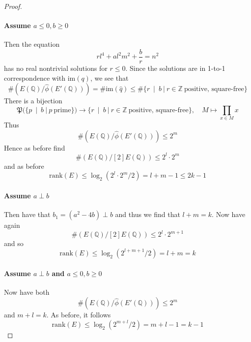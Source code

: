 \documentclass{scrartcl}
\newcommand{\Z}{\mathbb{Z}}
\newcommand{\Q}{\mathbb{Q}}
\newcommand{\im}{\mathrm{im}}
\newcommand{\divides}{\ \mid \ }
\theoremstyle{definition}
\begin{document}
\begin{proof}
    \paragraph{Assume $a \leq 0, b \geq 0$} Then the equation
    \begin{equation*}
        r l^4 + a l^2 m^2 + \frac b r = n^2
    \end{equation*}
    has no real nontrivial solutions for $r \leq 0$.
    Since the solutions are in 1-to-1 correspondence with $\im(q)$, we see that
    \begin{equation*}
        \#(E(\Q)/\hat{\phi}(E'(\Q))) = \#\im(\hat{q}) \leq \#\{ r \divides b \ | \ r \in \Z \ \text{positive, square-free} \}
    \end{equation*}
    There is a bijection
    \begin{equation*}
        \mathfrak{P}(\{ p \divides b \ | \ p \ \text{prime} \}) \to \{ r \divides b \ | \ r \in \Z \ \text{positive, square-free} \}, \quad M \mapsto \prod_{x \in M} x
    \end{equation*}
    Thus
    \begin{equation*}
        \#(E(\Q)/\hat{\phi}(E'(\Q))) \leq 2^m
    \end{equation*}
    Hence as before find
    \begin{equation*}
        \#(E(\Q)/[2]E(\Q)) \leq 2^l \cdot 2^m
    \end{equation*}
    and as before
    \begin{equation*}
        \mathrm{rank}(E) \leq \log_2(2^l \cdot 2^m / 2) = l + m - 1 \leq 2k - 1
    \end{equation*}

    \paragraph{Assume $a \perp b$} Then have that $b_1 = (a^2 - 4b) \perp b$ and thus we find that $l + m = k$.
    Now have again
    \begin{equation*}
        \#(E(\Q)/[2]E(\Q)) \leq 2^l \cdot 2^{m + 1}
    \end{equation*}
    and so
    \begin{equation*}
        \mathrm{rank}(E) \leq \log_2(2^{l + m + 1} / 2) = l + m = k
    \end{equation*}

    \paragraph{Assume $a \perp b$ and $a \leq 0, b \geq 0$} Now have both
    \begin{equation*}
        \#(E(\Q)/\hat{\phi}(E'(\Q))) \leq 2^m
    \end{equation*}
    and $m + l = k$.
    As before, it follows
    \begin{equation*}
        \mathrm{rank}(E) \leq \log_2(2^{m + l} / 2) = m + l - 1 = k - 1
    \end{equation*}
\end{proof}
\end{document}
